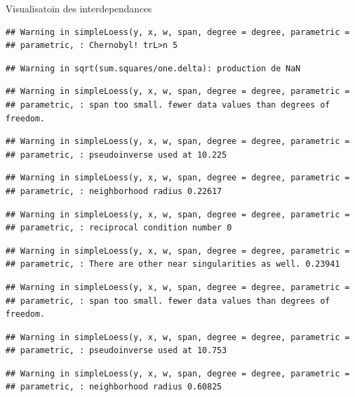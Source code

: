 \documentclass[11pt,ignorenonframetext,]{beamer}
\begin{document}
\begin{frame}[fragile]{Visualisatoin des interdependances}
\begin{verbatim}
## Warning in simpleLoess(y, x, w, span, degree = degree, parametric =
## parametric, : Chernobyl! trL>n 5
\end{verbatim}

\begin{verbatim}
## Warning in sqrt(sum.squares/one.delta): production de NaN
\end{verbatim}

\begin{verbatim}
## Warning in simpleLoess(y, x, w, span, degree = degree, parametric =
## parametric, : span too small. fewer data values than degrees of freedom.
\end{verbatim}

\begin{verbatim}
## Warning in simpleLoess(y, x, w, span, degree = degree, parametric =
## parametric, : pseudoinverse used at 10.225
\end{verbatim}

\begin{verbatim}
## Warning in simpleLoess(y, x, w, span, degree = degree, parametric =
## parametric, : neighborhood radius 0.22617
\end{verbatim}

\begin{verbatim}
## Warning in simpleLoess(y, x, w, span, degree = degree, parametric =
## parametric, : reciprocal condition number 0
\end{verbatim}

\begin{verbatim}
## Warning in simpleLoess(y, x, w, span, degree = degree, parametric =
## parametric, : There are other near singularities as well. 0.23941
\end{verbatim}

\begin{verbatim}
## Warning in simpleLoess(y, x, w, span, degree = degree, parametric =
## parametric, : span too small. fewer data values than degrees of freedom.
\end{verbatim}

\begin{verbatim}
## Warning in simpleLoess(y, x, w, span, degree = degree, parametric =
## parametric, : pseudoinverse used at 10.753
\end{verbatim}

\begin{verbatim}
## Warning in simpleLoess(y, x, w, span, degree = degree, parametric =
## parametric, : neighborhood radius 0.60825
\end{verbatim}


\end{frame}
\end{document}
